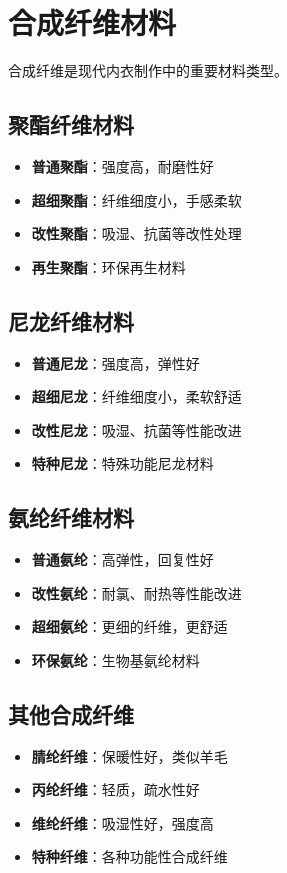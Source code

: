 \documentclass[12pt,UTF8]{ctexbook}
\begin{document}
\section{合成纤维材料}
合成纤维是现代内衣制作中的重要材料类型。

\subsection{聚酯纤维材料}
\begin{itemize}[leftmargin=2cm]
	\item \textbf{普通聚酯}：强度高，耐磨性好
	\item \textbf{超细聚酯}：纤维细度小，手感柔软
	\item \textbf{改性聚酯}：吸湿、抗菌等改性处理
	\item \textbf{再生聚酯}：环保再生材料
\end{itemize}

\subsection{尼龙纤维材料}
\begin{itemize}[leftmargin=2cm]
	\item \textbf{普通尼龙}：强度高，弹性好
	\item \textbf{超细尼龙}：纤维细度小，柔软舒适
	\item \textbf{改性尼龙}：吸湿、抗菌等性能改进
	\item \textbf{特种尼龙}：特殊功能尼龙材料
\end{itemize}

\subsection{氨纶纤维材料}
\begin{itemize}[leftmargin=2cm]
	\item \textbf{普通氨纶}：高弹性，回复性好
	\item \textbf{改性氨纶}：耐氯、耐热等性能改进
	\item \textbf{超细氨纶}：更细的纤维，更舒适
	\item \textbf{环保氨纶}：生物基氨纶材料
\end{itemize}

\subsection{其他合成纤维}
\begin{itemize}[leftmargin=2cm]
	\item \textbf{腈纶纤维}：保暖性好，类似羊毛
	\item \textbf{丙纶纤维}：轻质，疏水性好
	\item \textbf{维纶纤维}：吸湿性好，强度高
	\item \textbf{特种纤维}：各种功能性合成纤维
\end{itemize}
\end{document}
